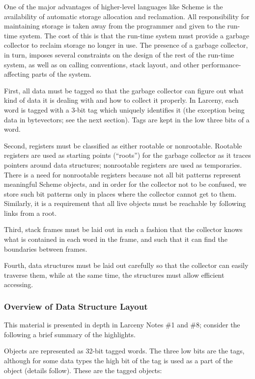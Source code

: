 One of the major advantages of higher-level languages like Scheme is
the availability of automatic storage allocation and reclamation. All
responsibility for maintaining storage is taken away from the programmer
and given to the run-time system. The cost of this is that the run-time
system must provide a garbage collector to reclaim storage no longer in
use. The presence of a garbage collector, in turn, imposes several
constraints on the design of the rest of the run-time system, as well as
on calling conventions, stack layout, and other performance-affecting
parts of the system.

First, all data must be tagged so that the garbage collector can
figure out what kind of data it is dealing with and how to collect it
properly. In Larceny, each word is tagged with a 3-bit tag which
uniquely identifies it (the exception being data in bytevectors; see
the next section).  Tags are kept in the low three bits of a word.

Second, registers must be classified as either rootable or
nonrootable.  Rootable registers are used as starting points
(``roots'') for the garbage collector as it traces pointers around
data structures; nonrootable registers are used as temporaries. There
is a need for nonrootable registers because not all bit patterns
represent meaningful Scheme objects, and in order for the collector
not to be confused, we store such bit patterns only in places where
the collector cannot get to them. Similarly, it is a requirement that
all live objects must be reachable by following links from a root.

Third, stack frames must be laid out in such a fashion that the
collector knows what is contained in each word in the frame, and such
that it can find the boundaries between frames.

Fourth, data structures must be laid out carefully so that the collector
can easily traverse them, while at the same time, the structures must allow
efficient accessing.

\subsubsection{Overview of Data Structure Layout}

This material is presented in depth in Larceny Notes \#1 and \#8; consider
the following a brief summary of the highlights.

Objects are represented as 32-bit tagged words. The three low bits are the
tags, although for some data types the high bit of the tag is used as a part
of the object (details follow). These are the tagged objects:

